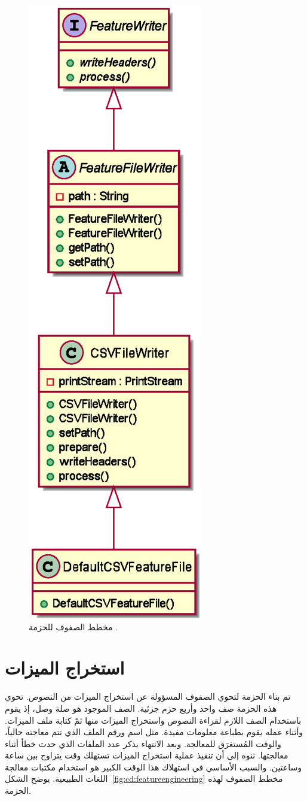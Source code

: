 \begin{figure}[htb]
	\centering
	\includegraphics[width=0.25\linewidth]{images/cd-writers.eps}
	\caption{%
		مخطط الصفوف للحزمة .
	}
	\label{fig:cd:writers}
\end{figure}

\afterpage{\clearpage}






\section{استخراج الميزات}
تم بناء الحزمة  لتحوي الصفوف المسؤولة عن استخراج الميزات من النصوص.
تحوي هذه الحزمة صف واحد وأربع حزم جزئية.
الصف الموجود  هو صلة وصل،
إذ يقوم باستخدام الصف اللازم لقراءة النصوص واستخراج الميزات منها ثمّ كتابة ملف الميزات.
وأثناء عمله يقوم بطباعة معلومات مفيدة.
مثل اسم ورقم الملف الذي تتم معاجته حالياً، والوقت المُستغرَق للمعالجة.
وبعد الانتهاء يذكر عدد الملفات الذي حدث خطأ أثناء معالجتها.
ننوه إلى أن تنفيذ عملية استخراج الميزات تستهلك وقت يتراوح بين ساعة وساعتين.
والسبب الأساسي في استهلاك هذا الوقت الكبير هو استخدام مكتبات معالجة اللغات الطبيعية.
يوضح الشكل~\ref{fig:cd:featureengineering} مخطط الصفوف لهذه الحزمة.

